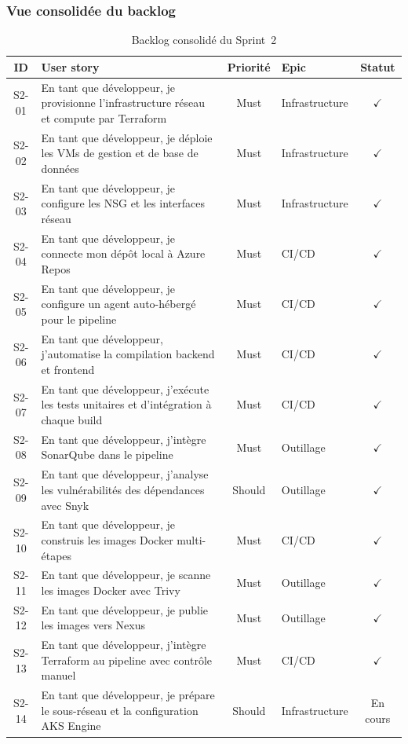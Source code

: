 \subsubsection{Vue consolidée du backlog}

\begin{table}[H]
\centering
\footnotesize
\renewcommand{\arraystretch}{0.85}
\setlength{\tabcolsep}{3pt}
\begin{tabular}{|c|p{6.8cm}|c|p{2.8cm}|c|}
\hline
\textbf{ID} & \textbf{User story} & \textbf{Priorité} & \textbf{Epic} & \textbf{Statut} \\
\hline
S2-01 & En tant que développeur, je provisionne l'infrastructure réseau et compute par Terraform & Must & Infrastructure & $\checkmark$ \\
\hline
S2-02 & En tant que développeur, je déploie les VMs de gestion et de base de données & Must & Infrastructure & $\checkmark$ \\
\hline
S2-03 & En tant que développeur, je configure les NSG et les interfaces réseau & Must & Infrastructure & $\checkmark$ \\
\hline
S2-04 & En tant que développeur, je connecte mon dépôt local à Azure Repos & Must & CI/CD & $\checkmark$ \\
\hline
S2-05 & En tant que développeur, je configure un agent auto-hébergé pour le pipeline & Must & CI/CD & $\checkmark$ \\
\hline
S2-06 & En tant que développeur, j'automatise la compilation backend et frontend & Must & CI/CD & $\checkmark$ \\
\hline
S2-07 & En tant que développeur, j'exécute les tests unitaires et d'intégration à chaque build & Must & CI/CD & $\checkmark$ \\
\hline
S2-08 & En tant que développeur, j'intègre SonarQube dans le pipeline & Must & Outillage & $\checkmark$ \\
\hline
S2-09 & En tant que développeur, j'analyse les vulnérabilités des dépendances avec Snyk & Should & Outillage & $\checkmark$ \\
\hline
S2-10 & En tant que développeur, je construis les images Docker multi-étapes & Must & CI/CD & $\checkmark$ \\
\hline
S2-11 & En tant que développeur, je scanne les images Docker avec Trivy & Must & Outillage & $\checkmark$ \\
\hline
S2-12 & En tant que développeur, je publie les images vers Nexus & Must & Outillage & $\checkmark$ \\
\hline
S2-13 & En tant que développeur, j'intègre Terraform au pipeline avec contrôle manuel & Must & CI/CD & $\checkmark$ \\
\hline
S2-14 & En tant que développeur, je prépare le sous-réseau et la configuration AKS Engine & Should & Infrastructure & En cours \\
\hline
\end{tabular}
\caption{Backlog consolidé du Sprint~2}
\label{tab:s2-backlog-consolide}
\end{table}

